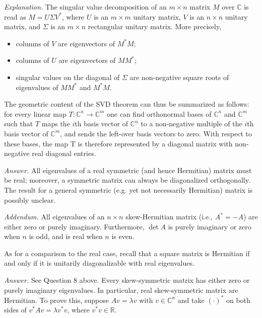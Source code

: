 \documentclass{mathproblems}
\newcommand\C{\mathbb{C}}
\newcommand\R{\mathbb{R}}
\begin{document}
\begin{questions}
\textit{Explanation.} The singular value decomposition of an $m\times n$ matrix $M$ over $\C$ is read as $M=U\Sigma V^*$, where $U$ is an $m\times m$ unitary matrix, $V$ is an $n\times n$ unitary matrix, and $\Sigma$ is an $m\times n$ rectangular unitary matrix. More precisely, \vspace{-6pt}
\begin{itemize}
\item columns of $V$ are eigenvectors of $M^*M$; \vspace{-4pt}
\item columns of $U$ are eigenvectors of $MM^*$; \vspace{-4pt}
\item singular values on the diagonal of $\Sigma$ are non-negative square roots of eigenvalues of $MM^*$ and $M^*M$.
\end{itemize} \vspace{-6pt}
The geometric content of the SVD theorem can thus be summarized as follows: for every linear map $T:\C^n \to \C^m$ one can find orthonormal bases of $\C^n$ and $\C^m$ such that $T$ maps the $i$th basis vector of $\C^n$ to a non-negative multiple of the $i$th basis vector of $\C^m$, and sends the left-over basis vectors to zero. With respect to these bases, the map T is therefore represented by a diagonal matrix with non-negative real diagonal entries.



\textit{Answer.}
All eigenvalues of a real symmetric (and hence Hermitian) matrix  must be real; moreover, a symmetric matrix can always be diagonalized orthogonally. The result for a general symmetric (e.g. yet not necessarily Hermitian) matrix is possibly unclear. 

\textit{Addendum.} All eigenvalues of an $n\times n$ skew-Hermitian matrix (i.e., $A^*=-A$) are either zero or purely imaginary. Furthermore, $\det A$ is purely imaginary or zero when $n$ is odd, and is real when $n$ is even.

As for a comparison to the real case, recall that a square matrix is Hermitian if and only if it is unitarily diagonalizable with real eigenvalues. 


\textit{Answer.} See Question 8 above. Every skew-symmetric matrix has either zero or purely imaginary eigenvalues. In particular, real skew-symmetric matrix are Hermitian. To prove this, suppose $Av=\lambda v$ with $v\in \C^n$ and take $(\cdot)^*$ on both sides of $v^* Av=\lambda v^*v$, where $v^*v\in \R$.



\end{questions}
\end{document}
